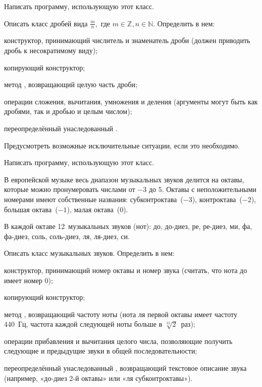 Написать программу, использующую этот класс.

\task Описать класс  дробей вида $\frac{m}{n},$ где
$m \in \mathbb{Z}, n \in \mathbb{N}$.  Определить в нем:
\begin{itemize*}
\item конструктор, принимающий числитель и знаменатель дроби (должен
  приводить дробь к несократимому виду);
\item копирующий конструктор;
\item метод , возвращающий целую часть дроби;
\item операции сложения, вычитания, умножения и деления (аргументы
  могут быть как дробями, так и дробью и целым числом);
\item переопределённый унаследованный .
\end{itemize*}

Предусмотреть возможные исключительные ситуации, если это необходимо.

Написать программу, использующую этот класс.

\task В европейской музыке весь диапазон музыкальных звуков делится на
октавы, которые можно пронумеровать числами от $-3$ до $5$. Октавы с
неположительными номерами имеют собственные названия:
субконтроктава~($-3$), контроктава~($-2$), большая октава~($-1$),
малая октава~($0$).

В каждой октаве 12~музыкальных звуков (нот): до, до-диез, ре, ре-диез,
ми, фа, фа-диез, соль, соль-диез, ля, ля-диез, си.

Описать класс  музыкальных звуков. Определить в нем:
\begin{itemize*}
\item конструктор, принимающий номер октавы и номер звука (считать,
  что нота до имеет номер $0$);
\item копирующий конструктор;
\item метод , возвращающий частоту ноты (нота ля первой
  октавы имеет частоту 440~Гц, частота каждой следующей ноты больше в
  $\sqrt[12]{2}$~раз);
\item операции прибавления и вычитания целого числа, позволяющие
  получить следующие и предыдущие звуки в общей последовательности;
\item переопределённый унаследованный , возвращающий текстовое
  описание звука (например, «до-диез 2-й октавы» или «ля
  субконтроктавы»).
\end{itemize*}

